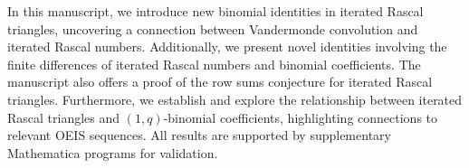 In this manuscript, we introduce new binomial identities in iterated Rascal triangles,
uncovering a connection between Vandermonde convolution and iterated Rascal numbers.
Additionally, we present novel identities involving the finite differences of iterated Rascal numbers
and binomial coefficients.
The manuscript also offers a proof of the row sums conjecture for iterated Rascal triangles.
Furthermore, we establish and explore the relationship between iterated Rascal triangles
and $(1,q)$-binomial coefficients, highlighting connections to relevant OEIS sequences.
All results are supported by supplementary Mathematica programs for validation.
